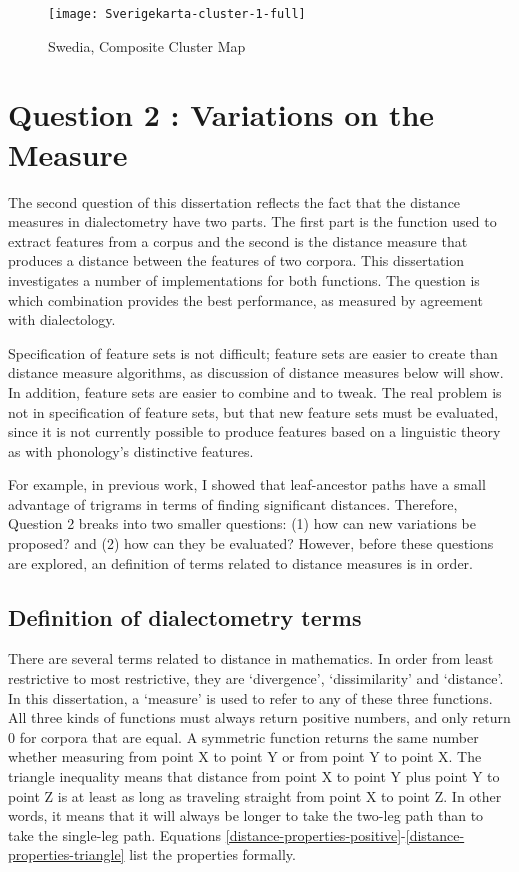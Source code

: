 \begin{figure}
  \texttt{[image: Sverigekarta-cluster-1-full]}
 \caption{Swedia, Composite Cluster Map}
  \label{composite-example-small}
\end{figure}


\section{Question 2 : Variations on the Measure}

The second question of this dissertation reflects the fact that the
distance measures in dialectometry have two
parts. The first part is the function used to extract features from a
corpus and the second is the distance measure that produces a distance
between the features of two corpora. This dissertation investigates a
number of implementations for both functions. The question is which
combination provides the best performance, as measured by agreement
with dialectology.

Specification of feature sets is not difficult; feature sets are
easier to create than distance measure algorithms, as discussion of
distance measures below will show. In addition, feature sets are
easier to combine and to tweak. The real problem is not in
specification of feature sets, but that new feature sets must be
evaluated, since it is not currently possible to produce features
based on a linguistic theory as with phonology's distinctive features.

For example, in previous work, I showed that leaf-ancestor paths have
a small advantage of trigrams \cite{sanders07} in terms of finding
significant distances. Therefore, Question 2 breaks into two smaller
questions: (1) how can new variations be proposed? and (2) how can
they be evaluated? However, before these questions are explored, an
definition of terms related to distance measures is in order.

\subsection{Definition of dialectometry terms}

There are several terms related to distance in mathematics. In order
from least restrictive to most restrictive, they are `divergence',
`dissimilarity' and `distance'. In this dissertation, a `measure' is
used to refer to any of these three functions.  All three kinds of
functions must always return positive numbers, and only return 0 for
corpora that are equal.  A symmetric function returns the same number
whether measuring from point X to point Y or from point Y to point
X. The triangle inequality means that distance from point X to point Y
plus point Y to point Z is at least as long as traveling straight from
point X to point Z.  In other words, it means that it will always be
longer to take the two-leg path than to take the single-leg
path. Equations
\ref{distance-properties-positive}-\ref{distance-properties-triangle}
list the properties formally.

